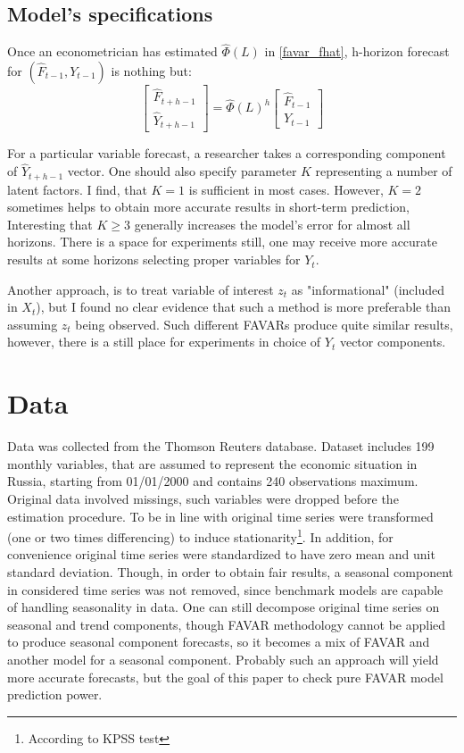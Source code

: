 \documentclass[a4paper, 14pt]{article}
\begin{document}
\subsection{Model's specifications}
Once an econometrician has estimated $\hat\Phi(L)$ in \eqref{favar_fhat}, h-horizon forecast for $(\hat{F}_{t-1}, Y_{t-1})$ is nothing but:
\[\begin{bmatrix}
\hat{F}_{t+h-1} \\
\hat{Y}_{t+h-1}
\end{bmatrix} = \hat\Phi (L) ^{h}
\begin{bmatrix}
\hat{F}_{t-1} \\
Y_{t-1}
\end{bmatrix}\]

For a particular variable forecast, a researcher takes a corresponding component of $\hat{Y}_{t+h-1}$ vector. One should also specify parameter $K$ representing a number of latent factors. I find, that $K=1$ is sufficient in most cases. However, $K=2$ sometimes helps to obtain more accurate results in short-term prediction, Interesting that $K\ge 3$ generally increases the model's error for almost all horizons. There is a space for experiments still, one may receive more accurate results at some horizons selecting proper variables for $Y_t$.

Another approach, is to treat variable of interest $z_t$ as "informational" (included in $X_t$), but I found no clear evidence that such a method is more preferable than assuming $z_t$ being observed. Such different FAVARs produce quite similar results, however, there is a still place for experiments in choice of $Y_t$ vector components. 

\section{Data}

Data was collected from the Thomson Reuters database. Dataset includes 199 monthly variables, that are assumed to represent the economic situation in Russia, starting from 01/01/2000 and contains 240 observations maximum. Original data involved missings, such variables were dropped before the estimation procedure. To be in line with \cite{bernanke2005measuring} original time series were transformed (one or two times differencing) to induce stationarity\footnote{According to KPSS test}. In addition, for convenience original time series were standardized to have zero mean and unit standard deviation. Though, in order to obtain fair results, a seasonal component in considered time series was not removed, since benchmark models are capable of handling seasonality in data. One can still decompose original time series on seasonal and trend components, though FAVAR methodology cannot be applied to produce seasonal component forecasts, so it becomes a mix of FAVAR and another model for a seasonal component. Probably such an approach will yield more accurate forecasts, but the goal of this paper to check pure FAVAR model prediction power.
\end{document}
